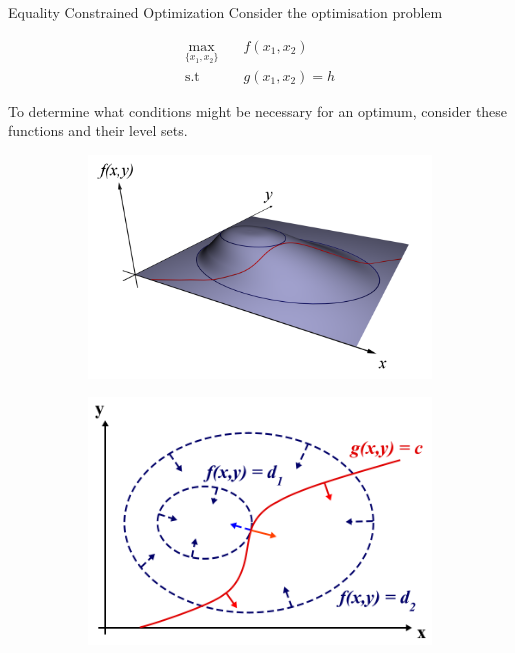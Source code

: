 \documentclass[11pt, xcolor={dvipsnames}, hyperref={colorlinks, allcolors=Blue}]{beamer}
\begin{document}
\begin{frame}{Equality Constrained Optimization}
Consider the optimisation problem

\begin{align*}
\underset{\{x_{1}, x_{2}\}}{\mathrm{max}}  \quad& f(x_{1}, x_{2})\\
\text{s.t}\quad \ \ & g(x_{1}, x_{2}) = h
\end{align*}

To determine what conditions might be necessary for an optimum, consider these functions and their level sets.

\begin{figure}
	\begin{subfigure}[b]{0.45\textwidth}
		\centering
		\includegraphics[width=\textwidth]{LagrangeMultipliers3D.png} 
	\end{subfigure}\hfill
	\begin{subfigure}[b]{0.45\textwidth}
		\centering
		\includegraphics[width=\textwidth]{LagrangeMultipliers2D.png} 
	\end{subfigure}\hfill
\end{figure}

\end{frame}
\end{document}
